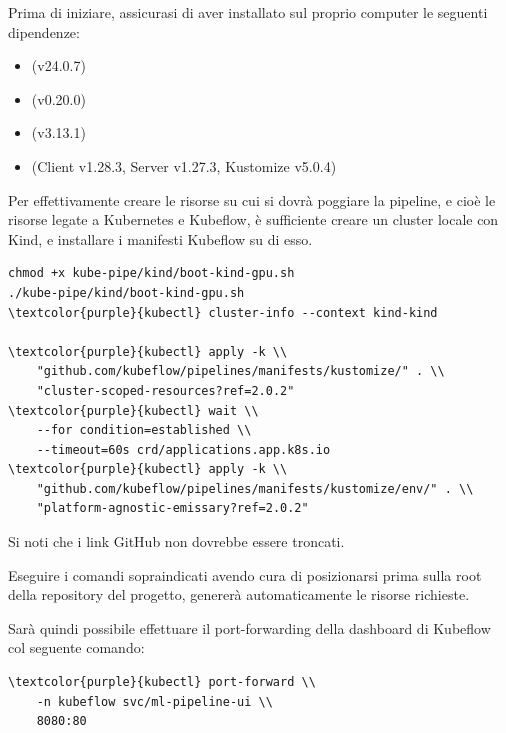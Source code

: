 Prima di iniziare, assicurasi di aver installato sul proprio computer le seguenti dipendenze:

\begin{itemize}
    \item {} (v24.0.7)
    \item {} (v0.20.0)
    \item {} (v3.13.1)
    \item {} (Client v1.28.3, Server v1.27.3, Kustomize v5.0.4)
\end{itemize}

Per effettivamente creare le risorse su cui si dovrà poggiare la pipeline, e cioè le risorse legate a Kubernetes e Kubeflow, è sufficiente creare un cluster locale con Kind, e installare i manifesti Kubeflow su di esso.

\begin{small}
\begin{Verbatim}[commandchars=\\\{\}]
chmod +x kube-pipe/kind/boot-kind-gpu.sh
./kube-pipe/kind/boot-kind-gpu.sh
\textcolor{purple}{kubectl} cluster-info --context kind-kind

\textcolor{purple}{kubectl} apply -k \\ 
    "github.com/kubeflow/pipelines/manifests/kustomize/" . \\
    "cluster-scoped-resources?ref=2.0.2"
\textcolor{purple}{kubectl} wait \\
    --for condition=established \\ 
    --timeout=60s crd/applications.app.k8s.io
\textcolor{purple}{kubectl} apply -k \\ 
    "github.com/kubeflow/pipelines/manifests/kustomize/env/" . \\
    "platform-agnostic-emissary?ref=2.0.2"
\end{Verbatim}
\end{small}

Si noti che i link GitHub non dovrebbe essere troncati.

Eseguire i comandi sopraindicati avendo cura di posizionarsi prima sulla root della repository del progetto, genererà automaticamente le risorse richieste.

Sarà quindi possibile effettuare il port-forwarding della dashboard di Kubeflow col seguente comando:

\begin{small}
\begin{Verbatim}[commandchars=\\\{\}]
\textcolor{purple}{kubectl} port-forward \\ 
    -n kubeflow svc/ml-pipeline-ui \\ 
    8080:80
\end{Verbatim}
\end{small}

